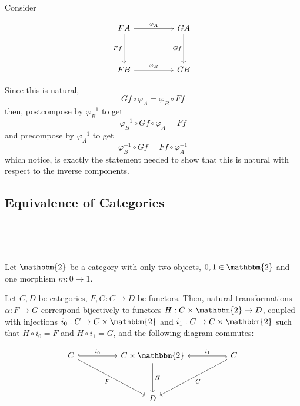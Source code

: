 \documentclass{article}
\begin{document}
\begin{solution}
\

Consider 

\[\begin{tikzcd}
	FA && GA \\
    \\
    FB && GB
    \arrow[from=1-1, to=1-3, "\varphi_A"]
    \arrow[from=3-1, to=3-3, "\varphi_B"]
    \arrow[from=1-1, to=3-1, "Ff"']
    \arrow[from=1-3, to=3-3, "Gf"']
\end{tikzcd}\]

Since this is natural, $$Gf \circ \varphi_A = \varphi_B \circ Ff$$then, postcompose by $\varphi_B ^{-1}$ to get $$\varphi_B ^{-1} \circ Gf \circ \varphi_A = Ff$$and precompose by $\varphi_A ^{-1}$ to get $$\varphi_B ^{-1} \circ Gf = Ff \circ \varphi_A ^{-1}$$which notice, is exactly the statement needed to show that this is natural with respect to the inverse components.
\end{solution}

\subsection{Equivalence of Categories}
\

\begin{lemma}
\

Let $\mathbbm{2}$ be a category with only two objects, $0,1 \in \mathbbm{2}$ and one morphism $m: 0 \to 1$.

Let $C, D$ be categories, $F,G: C \to D$ be functors. Then, natural transformations $\alpha: F \to G$ correspond bijectively to functors $H: C \times \mathbbm{2} \to D$, coupled with injections $i_0: C \to C \times \mathbbm{2}$ and $i_1: C \to C \times \mathbbm{2}$ such that $H \circ i_0 = F$ and $H \circ i_1 = G$, and the following diagram commutes:

\[\begin{tikzcd}
	C && C \times \mathbbm{2} && C \\
    \\
    && D &&
    \arrow[hook, from=1-1, to=1-3, "i_0"]
    \arrow[hook, from=1-5, to=1-3, "i_1"']
    \arrow[from=1-1, to=3-3, "F"']
    \arrow[from=1-5, to=3-3, "G"]
    \arrow[from=1-3, to=3-3, "H"]
\end{tikzcd}\]
\end{lemma}
\end{document}
